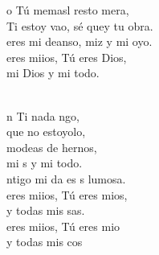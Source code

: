 \begin{cancion}
	o Tú memasl resto mera,\\
	 Ti estoy vao, sé quey tu obra. \\
	 eres mi deanso, miz y mi oyo.\\
	 eres miios, Tú eres Dios,\\
mi Dios y mi todo.\\\jump\\
	\begin{chorus}%
	n Ti nada ngo,\\
	 que no estoyolo,\\
	modeas de hernos, \\
	mi s y mi todo.\\
	ntigo mi da es s lumosa.\\
	 eres miios, Tú eres mios,\\
	y todas mis sas.\\
	 eres miios, Tú eres mio\\
	y todas mis cos\\
	\end{chorus}%
	\jump\\
	       \\
\end{cancion}%
